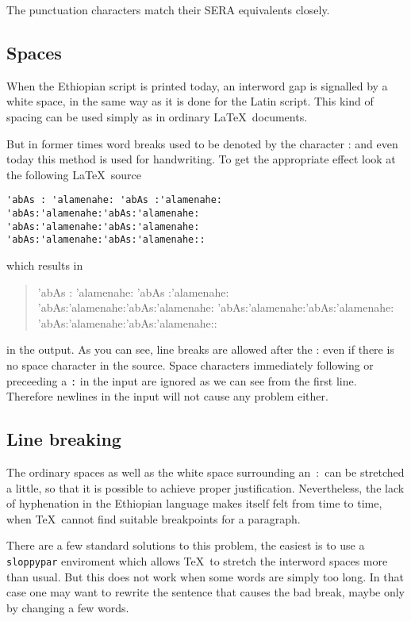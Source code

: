 \documentclass[a4paper]{article}
\newcommand{\eth}{\selectlanguage{ethiop}}
\begin{document}
The punctuation characters match their SERA equivalents closely.


\subsection{Spaces}

When the Ethiopian script is printed today, an interword gap
is signalled by a white space, in the same way as it is
done for the Latin script. This kind of spacing can
be used simply as in ordinary \LaTeX\ documents.

But in former times word breaks used to be denoted by the
character {\eth :} and even today this method is used for
handwriting. To get the appropriate effect look at the following
\LaTeX\ source
\begin{verbatim}
'abAs : 'alamenahe: 'abAs :'alamenahe:
'abAs:'alamenahe:'abAs:'alamenahe:
'abAs:'alamenahe:'abAs:'alamenahe:
'abAs:'alamenahe:'abAs:'alamenahe::
\end{verbatim}
which results in
\begin{quote}
\eth
'abAs : 'alamenahe: 'abAs :'alamenahe:
'abAs:'alamenahe:'abAs:'alamenahe:
'abAs:'alamenahe:'abAs:'alamenahe:
'abAs:'alamenahe:'abAs:'alamenahe::
\end{quote}
in the output. As you can see, line breaks are allowed after
the {\eth :} even if there is no space character in the
source. Space characters immediately following or preceeding
a \texttt{:} in the input are ignored as we can see from
the first line. Therefore newlines in the input
will not cause any problem either.


\subsection{Line breaking}

The ordinary spaces as well as the white space surrounding
an~{\eth :}~can be stretched a little,
so that it is possible to achieve proper justification.
Nevertheless, the lack of hyphenation in the Ethiopian language
makes itself felt from time to time, when \TeX\ cannot find
suitable breakpoints for a paragraph.

There are a few standard solutions to this problem, the easiest
is to use a \texttt{sloppypar} enviroment which allows \TeX\ to
stretch the interword spaces more than usual. But this does not
work when some words are simply too long. In that case
one may want to rewrite the sentence that causes the bad
break, maybe only by changing a few words.
\end{document}
